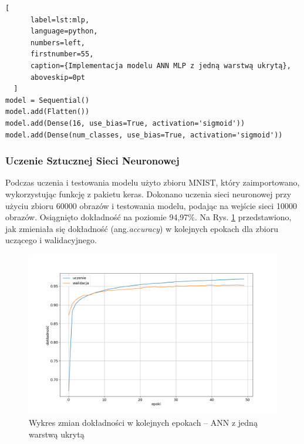 \begin{addmargin}[10mm]{0mm}
  \begin{lstlisting}[
      label=lst:mlp,
      language=python,
      numbers=left,
      firstnumber=55,
      caption={Implementacja modelu ANN MLP z jedną warstwą ukrytą},
      aboveskip=0pt
  ]
model = Sequential()
model.add(Flatten())
model.add(Dense(16, use_bias=True, activation='sigmoid'))
model.add(Dense(num_classes, use_bias=True, activation='sigmoid'))

  \end{lstlisting}
  \end{addmargin}

\subsubsection{Uczenie Sztucznej Sieci Neuronowej}
Podczas uczenia i testowania modelu użyto zbioru MNIST, który zaimportowano, wykorzystując
funkcję z pakietu keras. Dokonano uczenia sieci neuronowej przy użyciu zbioru 60000 
obrazów i testowania modelu, podając na wejście sieci 10000 obrazów. Osiągnięto 
dokładność na poziomie 94,97\%. Na Rys. \ref{keras-accuracy1} przedstawiono, jak zmieniała się dokładność (ang.\emph{accuracy}) w kolejnych epokach dla zbioru uczącego i walidacyjnego.

\begin{figure}[!h]
  \centering
  \includegraphics[width=\textwidth]{img/keras-accuracy1.png}
  \caption{Wykres zmian dokładności w kolejnych epokach -- ANN z jedną warstwą ukrytą}
  \label{keras-accuracy1}
\end{figure}



